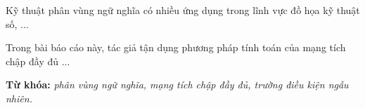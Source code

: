 \documentclass[./thesis.tex]{subfiles}
\begin{document}
{\fontsize{13}{12} \selectfont
Kỹ thuật phân vùng ngữ nghĩa có nhiều ứng dụng trong lĩnh vực đồ họa kỹ thuật số, ...}

{\fontsize{13}{12} \selectfont
Trong bài báo cáo này, tác giả tận dụng phương pháp tính toán của mạng tích chập đầy đủ ...}
\bigskip

{\bf Từ khóa:} \textit{ phân vùng ngữ nghĩa, mạng tích chập đầy đủ, trường điều kiện ngẫu nhiên.}
\end{document}
